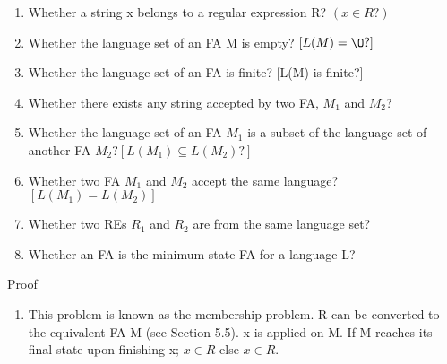\documentclass[8pt]{beamer}
\begin{document}
\begin{frame}
\begin{enumerate}
  \item Whether a string x belongs to a regular expression R? $(x \in R?)$ \\
  \item Whether the language set of an FA M is empty? $[L(M) = {\O} ?]$ \\
  \item Whether the language set of an FA is finite? [L(M) is finite?] \\
  \item Whether there exists any string accepted by two FA, $M_1$ and $M_2$? \\
  \item Whether the language set of an FA $M_1$ is a subset of the language set of another FA $M_2? [L(M_1) \subseteq
L(M_2)?]$ \\
  \item Whether two FA $M_1$ and $M_2$ accept the same language? $[L(M_1) = L(M_2)]$ \\
  \item Whether two REs $R_1$ and $R_2$ are from the same language set?\\
  \item Whether an FA is the minimum state FA for a language L? \\
\end{enumerate}

\vspace*{0.3cm}
Proof\\
\begin{enumerate}
  \item This problem is known as the membership problem. R can be converted to the equivalent FA M
(see Section 5.5). x is applied on M. If M reaches its final state upon finishing x; $x \in R$ else $x \in R$.\\
\end{enumerate}
\end{frame}
\end{document}
